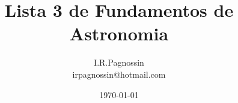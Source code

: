 \documentclass[a4paper,10pt]{article}
\begin{document}
\pagestyle{myheadings}
\renewcommand{\thefootnote}{\fnsymbol{footnote}}	

\title {Lista 3 de Fundamentos de Astronomia}  
\author {I.R.Pagnossin \\ irpagnossin@hotmail.com}
\date {\today}
\maketitle

 


\end{document}
